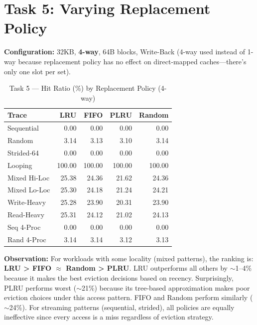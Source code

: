 \documentclass[12pt,a4paper]{article}
\begin{document}
\section{Task 5: Varying Replacement Policy}

\textbf{Configuration:} 32KB, \textbf{4-way}, 64B blocks, Write-Back (4-way used instead of 1-way because replacement policy has no effect on direct-mapped caches---there's only one slot per set).

\begin{table}[H]
\centering
\caption{Task 5 --- Hit Ratio (\%) by Replacement Policy (4-way)}
\begin{tabular}{lrrrr}
\toprule
\textbf{Trace} & \textbf{LRU} & \textbf{FIFO} & \textbf{PLRU} & \textbf{Random} \\
\midrule
Sequential     & 0.00  & 0.00  & 0.00  & 0.00  \\
Random         & 3.14  & 3.13  & 3.10  & 3.14  \\
Strided-64     & 0.00  & 0.00  & 0.00  & 0.00  \\
Looping        & 100.00& 100.00& 100.00& 100.00\\
Mixed Hi-Loc   & 25.38 & 24.36 & 21.62 & 24.36 \\
Mixed Lo-Loc   & 25.30 & 24.18 & 21.24 & 24.21 \\
Write-Heavy    & 25.28 & 23.90 & 20.31 & 23.90 \\
Read-Heavy     & 25.31 & 24.12 & 21.02 & 24.13 \\
Seq 4-Proc     & 0.00  & 0.00  & 0.00  & 0.00  \\
Rand 4-Proc    & 3.14  & 3.14  & 3.12  & 3.13  \\
\bottomrule
\end{tabular}
\end{table}

\textbf{Observation:} For workloads with some locality (mixed patterns), the ranking is: \textbf{LRU > FIFO $\approx$ Random > PLRU}. LRU outperforms all others by $\sim$1--4\% because it makes the best eviction decisions based on recency. Surprisingly, PLRU performs worst ($\sim$21\%) because its tree-based approximation makes poor eviction choices under this access pattern. FIFO and Random perform similarly ($\sim$24\%). For streaming patterns (sequential, strided), all policies are equally ineffective since every access is a miss regardless of eviction strategy.

\end{document}
